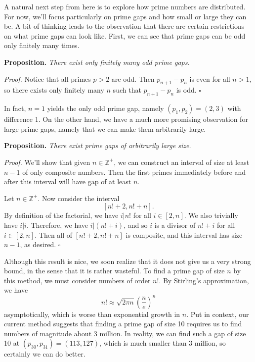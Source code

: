 \documentclass[conference]{IEEEtran}
\begin{document}
A natural next step from here is to explore how prime numbers
are distributed. For now, we'll focus particularly on prime
gaps and how small or large they can be. A bit of
thinking leads to the observation that there are certain
restrictions on what prime gaps can look like. First,
we can see that prime gaps can be odd only finitely many
times.

\medskip\noindent
\textbf{Proposition.} \textit{There exist only finitely many odd prime
gaps.}

\smallskip\noindent
\textit{Proof.} Notice that all primes $p > 2$ are odd. Then
$p_{n+1} - p_n$ is even for all $n > 1$, so there exists
only finitely many $n$ such that $p_{n+1} - p_n$ is odd.
\hfill$\square$\medskip

In fact, $n = 1$ yields the only odd prime gap, namely
$(p_1, p_2) = (2, 3)$ with difference $1$. On the other
hand, we have a much more promising observation for large
prime gaps, namely that we can make them arbitrarily large.

\medskip\noindent
\textbf{Proposition.} \textit{There exist prime gaps of arbitrarily
large size.}

\smallskip\noindent
\textit{Proof.} We'll show that given $n \in \mathbb{Z}^+$, we
can construct an interval of size at least $n - 1$ of only
composite numbers. Then the first primes immediately before
and after this interval will have gap of at least $n$.

Let $n \in \mathbb{Z}^+$. Now consider the interval
\[[n! + 2, n! + n].\] By definition of the
factorial, we have $i|n!$ for all $i \in [2, n]$. We also
trivially have $i|i$. Therefore, we have $i|(n! + i)$, and
so $i$ is a divisor of $n! + i$ for all $i \in [2, n]$.
Then all of $[n! + 2, n! + n]$ is composite, and this
interval has size $n - 1$, as desired.
\hfill$\square$\medskip

Although this result is nice, we soon realize that it does
not give us a very strong bound, in the sense that it is
rather wasteful. To find a prime gap of
size $n$ by this method, we must consider numbers of order
$n!$. By Stirling's approximation, we have
\[n! \approx \sqrt{2\pi n} \left(\frac{n}{e}\right)^n\]
asymptotically, which is worse than exponential growth in $n$.
Put in context, our current method suggests that finding
a prime gap of size 10 requires us to find numbers
of magnitude about 3 million. In reality, we can find such a
gap of size 10 at $(p_{30}, p_{31}) = (113, 127)$, which is
much smaller than 3 million, so certainly we can
do better.
\end{document}
